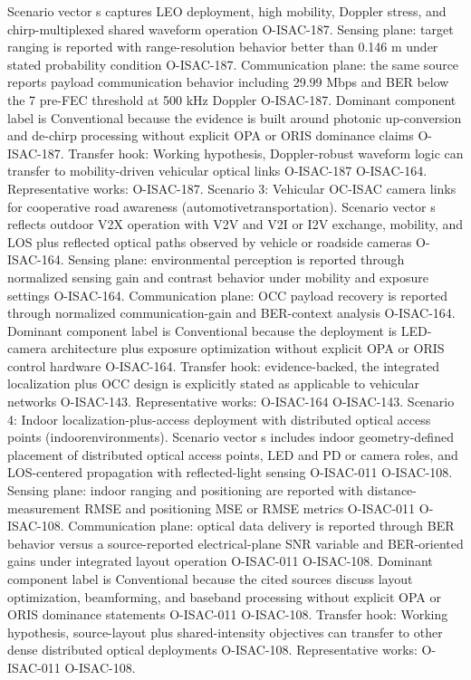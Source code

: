 {}Scenario vector s captures LEO deployment, high mobility, Doppler stress, and chirp-multiplexed shared waveform operation O-ISAC-187. Sensing plane: target ranging is reported with range-resolution behavior better than 0.146 m under stated probability condition O-ISAC-187. Communication plane: the same source reports payload communication behavior including 29.99 Mbps and BER below the 7\markdownRendererPercentSign{} pre-FEC threshold at 500 kHz Doppler O-ISAC-187. Dominant component label is Conventional because the evidence is built around photonic up-conversion and de-chirp processing without explicit OPA or ORIS dominance claims O-ISAC-187. Transfer hook: Working hypothesis, Doppler-robust waveform logic can transfer to mobility-driven vehicular optical links O-ISAC-187 O-ISAC-164. Representative works: O-ISAC-187.\markdownRendererInterblockSeparator
{}
\markdownRendererSectionEnd \markdownRendererSectionBegin
{}\markdownRendererInterblockSeparator
{}Scenario 3: Vehicular OC-ISAC camera links for cooperative road awareness (automotive\markdownRendererUnderscore{}transportation).\markdownRendererHardLineBreak
{}Scenario vector s reflects outdoor V2X operation with V2V and V2I or I2V exchange, mobility, and LOS plus reflected optical paths observed by vehicle or roadside cameras O-ISAC-164. Sensing plane: environmental perception is reported through normalized sensing gain and contrast behavior under mobility and exposure settings O-ISAC-164. Communication plane: OCC payload recovery is reported through normalized communication-gain and BER-context analysis O-ISAC-164. Dominant component label is Conventional because the deployment is LED-camera architecture plus exposure optimization without explicit OPA or ORIS control hardware O-ISAC-164. Transfer hook: evidence-backed, the integrated localization plus OCC design is explicitly stated as applicable to vehicular networks O-ISAC-143. Representative works: O-ISAC-164 O-ISAC-143.\markdownRendererParagraphSeparator
{}Scenario 4: Indoor localization-plus-access deployment with distributed optical access points (indoor\markdownRendererUnderscore{}environments).\markdownRendererHardLineBreak
{}Scenario vector s includes indoor geometry-defined placement of distributed optical access points, LED and PD or camera roles, and LOS-centered propagation with reflected-light sensing O-ISAC-011 O-ISAC-108. Sensing plane: indoor ranging and positioning are reported with distance-measurement RMSE and positioning MSE or RMSE metrics O-ISAC-011 O-ISAC-108. Communication plane: optical data delivery is reported through BER behavior versus a source-reported electrical-plane SNR variable and BER-oriented gains under integrated layout operation O-ISAC-011 O-ISAC-108. Dominant component label is Conventional because the cited sources discuss layout optimization, beamforming, and baseband processing without explicit OPA or ORIS dominance statements O-ISAC-011 O-ISAC-108. Transfer hook: Working hypothesis, source-layout plus shared-intensity objectives can transfer to other dense distributed optical deployments O-ISAC-108. Representative works: O-ISAC-011 O-ISAC-108.\markdownRendererInterblockSeparator
